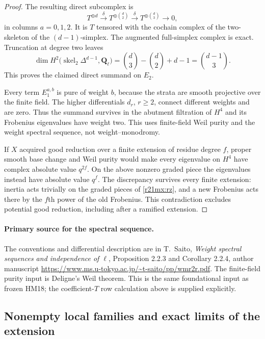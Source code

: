 \begin{proof}
The resulting direct subcomplex is
\[
 T^{\oplus d}\xrightarrow{\delta}
 T^{\oplus\binom d2}\xrightarrow{\delta}
 T^{\oplus\binom d3}\longrightarrow0,
 \tag{MX21.14}\label{r21mx:Tcomplex}
\]
in columns $a=0,1,2$.  It is $T$ tensored with the cochain complex
of the two-skeleton of the $(d-1)$-simplex.  The augmented full-simplex
complex is exact.  Truncation at degree two leaves
\[
 \dim H^2\bigl(\operatorname{skel}_2\Delta^{d-1},\mathbf Q_\ell\bigr)
   =\binom d3-\binom d2+d-1=\binom{d-1}{3}.
 \tag{MX21.15}\label{r21mx:binomial}
\]
This proves the claimed direct summand on $E_2$.

Every term $E_1^{a,b}$ is pure of weight $b$, because the strata are
smooth projective over the finite field.  The higher differentials
$d_r$, $r\ge2$, connect different weights and are zero.  Thus the
summand survives in the abutment filtration of $H^4$ and its
Frobenius eigenvalues have weight two.  This uses finite-field Weil
purity and the weight spectral sequence, not weight--monodromy.

If $X$ acquired good reduction over a finite extension of residue
degree $f$, proper smooth base change and Weil purity would make
every eigenvalue on $H^4$ have complex absolute value $q^{2f}$.
On the above nonzero graded piece the eigenvalues instead have
absolute value $q^f$.  The discrepancy survives every finite
extension: inertia acts trivially on the graded pieces of
\eqref{r21mx:rz}, and a new Frobenius acts there by the $f$th power
of the old Frobenius.  This contradiction excludes potential good
reduction, including after a ramified extension.
\end{proof}

\paragraph{Primary source for the spectral sequence.}
The conventions and differential description are in T.~Saito,
\emph{Weight spectral sequences and independence of $\ell$},
Proposition 2.2.3 and Corollary 2.2.4, author manuscript
\url{https://www.ms.u-tokyo.ac.jp/~t-saito/pp/wmr2r.pdf}.
The finite-field purity input is Deligne's Weil theorem.  This is
the same foundational input as frozen HM18; the coefficient-$T$
row calculation above is supplied explicitly.

\subsection{Nonempty local families and exact limits of the extension}

